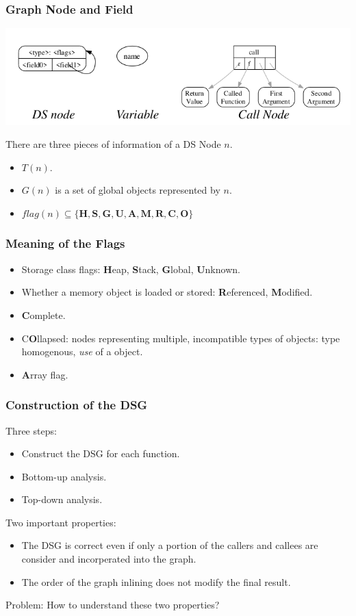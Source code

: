 \documentclass[aspectratio=1610, 13pt]{beamer}
\begin{document}
\begin{frame}\frametitle{Graph Node and Field}
\begin{center}
\includegraphics[scale=0.4]{dsg_legend.png}
\end{center}
There are three pieces of information of a DS Node $n$.
\begin{itemize}
\item $T(n)$.
\item $G(n)$ is a set of global objects represented by $n$.
\item $flag(n)\subseteq \{\mathbf{H,S,G,U,A,M,R,C,O}\}$
\end{itemize}
\end{frame}

\begin{frame}\frametitle{Meaning of the Flags}
\begin{itemize}
\item Storage class flags: \textbf{H}eap, \textbf{S}tack, \textbf{G}lobal, \textbf{U}nknown.

\item Whether a memory object is loaded or stored: \textbf{R}eferenced, \textbf{M}odified.

\item \textbf{C}omplete.
\item C\textbf{O}llapsed: nodes representing multiple, incompatible types of objects: type homogenous, \emph{use} of a object.
\item \textbf{A}rray flag.
\end{itemize}

\end{frame}

\begin{frame}\frametitle{Construction of the DSG}
Three steps:
\begin{itemize}
\item Construct the DSG for each function.
\item Bottom-up analysis.
\item Top-down analysis.

\end{itemize}
Two important properties:
\begin{itemize}
\item The DSG is correct even if only a portion of the callers and callees are consider and incorperated into the graph.
\item  The order of the graph inlining does not modify the final result.
\end{itemize}

Problem: How to understand these two properties?
\end{frame}
\end{document}
